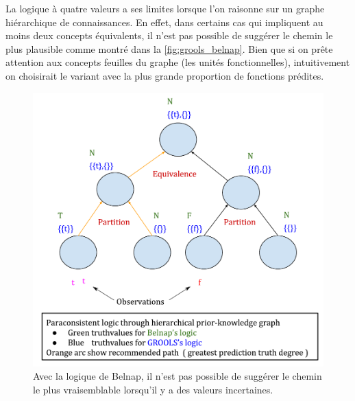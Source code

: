 \begin{refsegment}
La logique à quatre valeurs a ses limites lorsque l'on raisonne sur un graphe hiérarchique de connaissances. En effet, dans certains cas qui impliquent au moins deux concepts équivalents, il n'est pas possible de suggérer le chemin le plus plausible comme montré dans la \cref{fig:grools_belnap}. Bien que si on prête attention aux concepts feuilles du graphe (les unités fonctionnelles), intuitivement on choisirait le variant avec la plus grande proportion de fonctions prédites.

\begin{shadedfigure}[H]
	\begin{subfigure}[t]{.48\textwidth}
		\centering
		\includegraphics[width=\textwidth]{img/GROOLS_vs_belnap_1.pdf}
		\caption{Avec la logique de Belnap, il n'est pas possible de suggérer le chemin le plus vraisemblable lorsqu'il y a des valeurs incertaines.}
		\label{fig:grools_belnap_1}
	\end{subfigure}
	\hfill
	\begin{subfigure}[t]{.48\textwidth}
		\centering

\end{subfigure}
\end{shadedfigure}
\end{refsegment}
